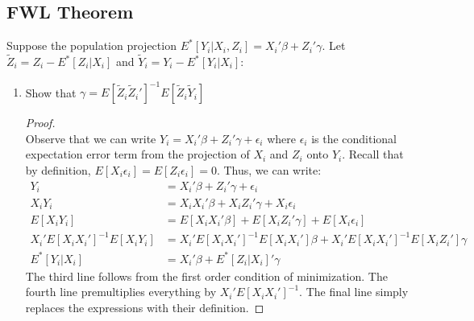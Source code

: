 \documentclass[11pt]{article}
\begin{document}
\subsection*{FWL Theorem}
Suppose the population projection $E^*[Y_i|X_i,Z_i] = X_i'\beta + Z_i'\gamma$. Let $\tilde Z_i = Z_i - E^*[Z_i|X_i]$ and $\tilde Y_i = Y_i - E^*[Y_i|X_i]$:

\begin{enumerate}[label = (\alph*)]
	\item Show that $\gamma = E\left[\tilde Z_i \tilde Z_i'\right]^{-1} E\left[\tilde Z_i \tilde Y_i\right]$
	\begin{proof}\mbox{}\\
		Observe that we can write $Y_i = X_i'\beta + Z_i'\gamma + \epsilon_i$ where $\epsilon_i$ is the conditional expectation error term from the projection of $X_i$ and $Z_i$ onto $Y_i$. Recall that by definition, $E[X_i \epsilon_i] = E[Z_i \epsilon_i] = 0$. Thus, we can write:
		\begin{align*}
			Y_i & = X_i'\beta + Z_i'\gamma + \epsilon_i \\
			X_i Y_i & = X_i X_i'\beta + X_i Z_i'\gamma + X_i \epsilon_i \\
			E[X_i Y_i] & = E[X_i X_i'\beta] + E[X_i Z_i'\gamma] + E[X_i \epsilon_i]\\
			X_i'E[X_iX_i']^{-1}E[X_i Y_i] & = X_i'E[X_iX_i']^{-1}E[X_i X_i']\beta + X_i'E[X_iX_i']^{-1}E[X_i Z_i']\gamma \\
			E^*[Y_i|X_i] & = X_i'\beta + E^*[Z_i|X_i]'\gamma
		\end{align*}
		The third line follows from the first order condition of minimization. The fourth line premultiplies everything by $X_i'E[X_iX_i']^{-1}$. The final line simply replaces the expressions with their definition.


\end{proof}
\end{enumerate}
\end{document}
